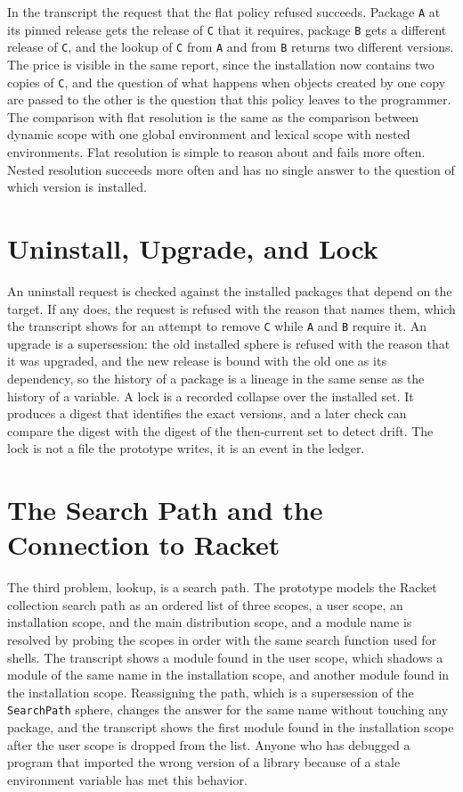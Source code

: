 
In the transcript the request that the flat policy refused succeeds. Package \texttt{A} at its pinned release gets the release of \texttt{C} that it requires, package \texttt{B} gets a different release of \texttt{C}, and the lookup of \texttt{C} from \texttt{A} and from \texttt{B} returns two different versions. The price is visible in the same report, since the installation now contains two copies of \texttt{C}, and the question of what happens when objects created by one copy are passed to the other is the question that this policy leaves to the programmer. The comparison with flat resolution is the same as the comparison between dynamic scope with one global environment and lexical scope with nested environments. Flat resolution is simple to reason about and fails more often. Nested resolution succeeds more often and has no single answer to the question of which version is installed.

\section{Uninstall, Upgrade, and Lock}

An uninstall request is checked against the installed packages that depend on the target. If any does, the request is refused with the reason that names them, which the transcript shows for an attempt to remove \texttt{C} while \texttt{A} and \texttt{B} require it. An upgrade is a supersession: the old installed sphere is refused with the reason that it was upgraded, and the new release is bound with the old one as its dependency, so the history of a package is a lineage in the same sense as the history of a variable. A lock is a recorded collapse over the installed set. It produces a digest that identifies the exact versions, and a later check can compare the digest with the digest of the then-current set to detect drift. The lock is not a file the prototype writes, it is an event in the ledger.

\section{The Search Path and the Connection to Racket}

The third problem, lookup, is a search path. The prototype models the Racket collection search path as an ordered list of three scopes, a user scope, an installation scope, and the main distribution scope, and a module name is resolved by probing the scopes in order with the same search function used for shells. The transcript shows a module found in the user scope, which shadows a module of the same name in the installation scope, and another module found in the installation scope. Reassigning the path, which is a supersession of the \texttt{SearchPath} sphere, changes the answer for the same name without touching any package, and the transcript shows the first module found in the installation scope after the user scope is dropped from the list. Anyone who has debugged a program that imported the wrong version of a library because of a stale environment variable has met this behavior.


